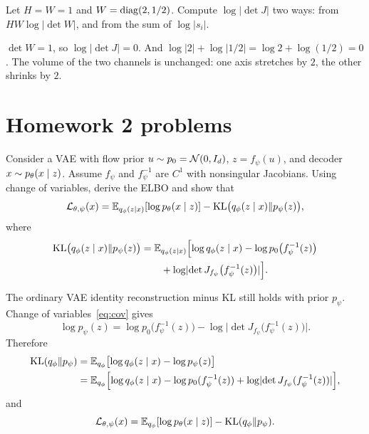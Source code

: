 \begin{practbox}
Let $H=W=1$ and $W=\operatorname{diag}(2,1/2)$. Compute $\log\lvert\det J\rvert$ two ways: from $HW\log\lvert\det W\rvert$, and from the sum of $\log\lvert s_i\rvert$.
\end{practbox}
\begin{solbox}
$\det W=1$, so $\log\lvert\det J\rvert=0$. And $\log\lvert 2\rvert+\log\lvert 1/2\rvert=\log 2+\log(1/2)=0$. The volume of the two channels is unchanged: one axis stretches by $2$, the other shrinks by $2$.
\end{solbox}

\section{Homework 2 problems}

\begin{hwqbox}
Consider a VAE with flow prior $u\sim p_0=\mathcal{N}(0,I_d)$, $z=f_\psi(u)$, and decoder $x\sim p_\theta(x\mid z)$. Assume $f_\psi$ and $f_\psi^{-1}$ are $C^1$ with nonsingular Jacobians. Using change of variables, derive the ELBO and show that
\[
\mathcal L_{\theta,\psi}(x)
=\mathbb{E}_{q_\phi(z\mid x)}[\log p_\theta(x\mid z)]
-\mathrm{KL}\bigl(q_\phi(z\mid x)\Vert p_\psi(z)\bigr),
\]
where
\begin{align*}
\mathrm{KL}\bigl(q_\phi(z\mid x)\Vert p_\psi(z)\bigr)
&=\mathbb{E}_{q_\phi(z\mid x)}\Bigl[
\log q_\phi(z\mid x)
-\log p_0\bigl(f_\psi^{-1}(z)\bigr)\\
&\qquad+\log\lvert\det J_{f_\psi}\bigl(f_\psi^{-1}(z)\bigr)\rvert
\Bigr].
\end{align*}
\end{hwqbox}
\begin{hwsolbox}
The ordinary VAE identity reconstruction minus KL still holds with prior $p_\psi$. Change of variables~\eqref{eq:cov} gives
\[
\log p_\psi(z)
=\log p_0\bigl(f_\psi^{-1}(z)\bigr)
-\log\lvert\det J_{f_\psi}\bigl(f_\psi^{-1}(z)\bigr)\rvert.
\]
Therefore
\begin{align*}
\mathrm{KL}(q_\phi\Vert p_\psi)
&=\mathbb{E}_{q_\phi}\bigl[\log q_\phi(z\mid x)-\log p_\psi(z)\bigr]\\
&=\mathbb{E}_{q_\phi}\Bigl[
\log q_\phi(z\mid x)
-\log p_0(f_\psi^{-1}(z))
+\log\lvert\det J_{f_\psi}(f_\psi^{-1}(z))\rvert
\Bigr],
\end{align*}
and
\[
\mathcal L_{\theta,\psi}(x)
=\mathbb{E}_{q_\phi}[\log p_\theta(x\mid z)]-\mathrm{KL}(q_\phi\Vert p_\psi).
\]
\end{hwsolbox}

